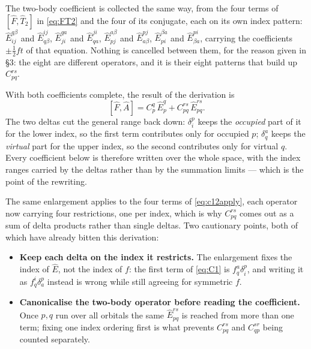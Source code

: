 \documentclass[11pt]{article}
\newcommand{\E}[2]{\hat E^{#1}_{#2}}
\newcommand{\occ}{i}
\newcommand{\vir}{a}
\begin{document}
The two-body coefficient is collected the same way, from the four terms of
$[\hat F,\hat T_2]$ in \eqref{eq:FT2} and the four of its conjugate, each on its
own index pattern: $\E{q\beta}{\occ j}$ and $\E{\occ j}{q\beta}$,
$\E{q\vir}{j\occ}$ and $\E{j\occ}{q\vir}$, $\E{\vir\beta}{pj}$ and
$\E{pj}{\vir\beta}$, $\E{\beta\vir}{p\occ}$ and $\E{p\occ}{\beta\vir}$, carrying
the coefficients $\pm\tfrac12 f t$ of that equation. Nothing is cancelled
between them, for the reason given in \S3: the eight are different operators,
and it is their eight patterns that build up $C^{rs}_{pq}$.

With both coefficients complete, the result of the derivation is
\begin{equation}
  \boxed{\;[\hat F,\hat A]=C^q_p\,\E{q}{p}+C^{rs}_{pq}\,\E{rs}{pq}.\;}
  \label{eq:result}
\end{equation}
The two deltas cut the general range back down: $\delta^p_\occ$ keeps the
\emph{occupied} part of it for the lower index, so the first term contributes
only for occupied $p$; $\delta^\vir_q$ keeps the \emph{virtual} part for the
upper index, so the second contributes only for virtual $q$. Every coefficient
below is therefore written over the whole space, with the index ranges carried
by the deltas rather than by the summation limits --- which is the point of the
rewriting.

The same enlargement applies to the four terms of \eqref{eq:c12apply}, each
operator now carrying four restrictions, one per index, which is why
$C^{rs}_{pq}$ comes out as a sum of delta products rather than single deltas.
Two cautionary points, both of which have already bitten this derivation:

\begin{itemize}
  \item \textbf{Keep each delta on the index it restricts.} The enlargement
        fixes the index of $\hat E$, not the index of $f$: the first term of
        \eqref{eq:C1} is $f^\vir_q\delta^p_\occ$, and writing it as
        $f^\occ_q\delta^p_\vir$ instead is wrong while still agreeing for
        symmetric $f$.
  \item \textbf{Canonicalise the two-body operator before reading the
        coefficient.} Once $p,q$ run over all orbitals the same $\E{rs}{pq}$ is
        reached from more than one term; fixing one index ordering first is
        what prevents $C^{rs}_{pq}$ and $C^{sr}_{qp}$ being counted separately.
\end{itemize}
\end{document}
